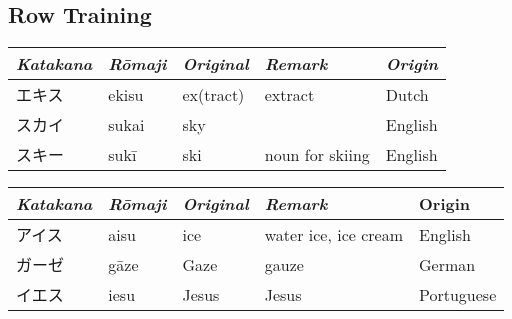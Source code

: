 \subsection{ Row Training}\label{sec:SaRowTraining}
\Padding
\begin{longtable}[c]{p{2cm}p{2cm}p{3cm}p{6cm}p{2cm}}
\textit{Katakana}&\textit{Rōmaji}&\textit{Original}&\textit{Remark}&\textit{Origin}\\\hline
エキス&ekisu&ex(tract)&extract&Dutch\\
スカイ&sukai&sky&&English\\
スキー&sukī&ski&noun for skiing&English\\
\end{longtable}


\newpage

\Padding
\begin{longtable}[c]{p{2cm}p{2cm}p{3cm}p{6cm}p{2cm}}
\textit{Katakana}&\textit{Rōmaji}&\textit{Original}&\textit{Remark}&Origin\\\hline
アイス&aisu&ice&water ice, ice cream&English\\
ガーゼ&gāze&Gaze&gauze&German\\
イエス&iesu&Jesus&Jesus&Portuguese\\
\end{longtable}


\newpage
